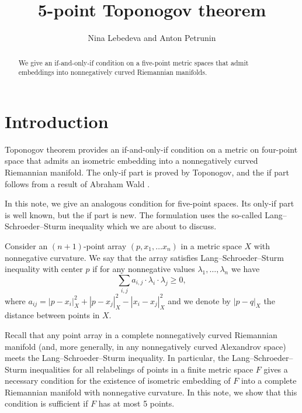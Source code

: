 \documentclass{article}
\begin{document}


\title{5-point Toponogov theorem}
\author{Nina Lebedeva and Anton Petrunin}

\date{}
\maketitle
\begin{abstract}
We give an if-and-only-if condition on a five-point metric spaces that admit embeddings into nonnegatively curved Riemannian manifolds.
\end{abstract}


\section{Introduction}

Toponogov theorem provides an if-and-only-if condition on a metric on four-point space that admits an isometric embedding into a nonnegatively curved Riemannian manifold.
The only-if part is proved by Toponogov, and the if part follows from a result of Abraham Wald \cite[\S 7]{wald}.

In this note, we give an analogous condition for five-point spaces.
Its only-if part is well known, but the if part is new.
The formulation uses the so-called Lang--Schroeder--Sturm inequality \cite{lang-schroeder, sturm} which we are about to discuss.

Consider an $(n+1)$-point array $(p,x_1,\dots x_n)$ in a metric space $X$ with nonnegative curvature.
We say that the array satisfies Lang--Schroeder--Sturm inequality with center $p$
if for any nonnegative values $\lambda_1,\dots,\lambda_n$ we have
\[\sum_{i,j}a_{i,j}\cdot \lambda_i\cdot\lambda_j\ge 0,\]
where $a_{ij}=|p-x_i|_X^2+|p-x_j|_X^2-|x_i-x_j|_X^2$
and we denote by $|p-q|_X$ the distance between points in $X$.

Recall that any point array in a  complete nonnegatively curved Riemannian manifold (and, more generally, in any nonnegatively curved Alexandrov space) meets the Lang--Schroeder--Sturm inequality.
In particular, 
the Lang--Schroeder--Sturm inequalities for all relabelings of points in a finite metric space $F$
gives a necessary condition for the existence of isometric embedding of $F$ into a complete Riemannian manifold with nonnegative curvature.
In this note, we show that this condition is sufficient if $F$ has at most 5 points.
\end{document}

